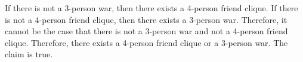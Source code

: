 \documentclass[fleqn]{article}
\begin{document}
If there is not a 3-person war, then there exists a 4-person friend clique. If there is not a 4-person friend clique, then there exists a 3-person war. Therefore, it cannot be the case that there is not a 3-person war and not a 4-person friend clique. Therefore, there exists a 4-person friend clique or a 3-person war. The claim is true.
\end{document}
